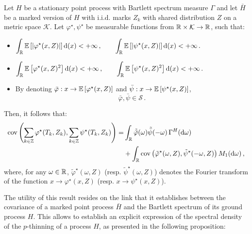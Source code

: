 \begin{theorem}\label{th:chap5_spectral_marked}
    Let $H$ be a stationary point process with Bartlett spectrum measure $\Gamma$ and 
    let $\bar H$ be a marked version of $H$ with i.i.d. marks $Z_k$ with shared distribution $Z$ on a metric space $\mathcal{K}$.
    Let $\varphi^\star, \psi^\star$ be measurable functions from ${\mathbb R} \times \mathcal{K} \to {\mathbb R}$, 
    such that:
    \begin{itemize}
        \item $\displaystyle
            \int_{{\mathbb R}}{{\mathbb E}\left[|\varphi^\star(x, Z)|\right]{\mathrm{d}}(x)} < +\infty\,,\qquad \int_{{\mathbb R}}{{\mathbb E}\left[|\psi^\star(x, Z)|\right]{\mathrm{d}}(x)} < +\infty\,.
        $
        \item $\displaystyle
            \int_{{\mathbb R}}{{\mathbb E}\left[\varphi^\star(x, Z)^2\right]{\mathrm{d}}(x)} < +\infty\,,\qquad\int_{{\mathbb R}}{{\mathbb E}\left[\psi^\star(x, Z)^2\right]{\mathrm{d}}(x)} < +\infty\,.
        $
        \item By denoting $\bar \varphi : x\to {\mathbb E}\left[\varphi^\star(x, Z)\right]$ and $\bar \psi : x\to {\mathbb E}\left[\psi^\star(x, Z)\right]$,
              \[\bar \varphi,\bar \psi \in\mathcal{S}\,.\]
    \end{itemize}

    Then, it follows that:
    \begin{align}\label{eq:chap5_marked_spectrum}
        \operatorname{cov}\left(\sum_{k\in{\mathbb Z}}{\varphi^\star(T_k, Z_k)}, \sum_{k\in{\mathbb Z}}{\psi^\star(T_k, Z_k)}\right) =& 
        \int_{{\mathbb R}}{\tilde {\bar\varphi} (\omega) \tilde{\bar \psi} (-\omega)\,\Gamma^H({\mathrm{d}} \omega)} \\
        &+ \int_{{\mathbb R}}{\operatorname{cov}\left( \tilde \varphi^\star(\omega, Z), \tilde \psi^\star (-\omega, Z)\right)M_1({\mathrm{d}} \omega)}\nonumber\,,
    \end{align}
    where, for any $\omega\in{\mathbb R}$, $\tilde \varphi^\star(\omega, Z)$ (resp. $\tilde \psi^\star(\omega, Z)$) denotes the Fourier transform of the function $x\to \varphi^\star(x, Z)$ (resp. $x\to \psi^\star(x, Z)$).
\end{theorem}

The utility of this result resides on the link that it establishes between the covariance of a marked point process $\bar H$
and the Bartlett spectrum of its ground process $H$. 
This allows to establish an explicit expression of the spectral density of the $p$-thinning of a process $H$, 
as presented in the following proposition:

